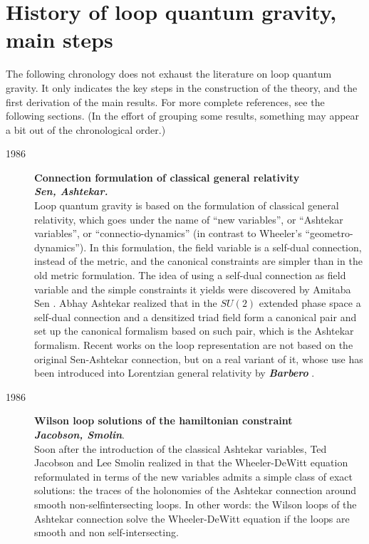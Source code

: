 \section{History of loop quantum gravity, main steps}\label{3}

The following chronology does not exhaust the literature on loop 
quantum gravity.  It only indicates the key steps in the construction 
of the theory, and the first derivation of the main results.  For more 
complete references, see the following sections.  (In the effort 
of grouping some results, something may appear a bit out of the 
chronological order.) 

\begin{description}

	\item[1986] {\bf  Connection formulation of classical general 
 	relativity\\ {\em Sen, Ashtekar.}}\\ 
	Loop quantum gravity is based on the formulation of classical 
	general relativity, which goes under the name of ``new 
	variables'', or ``Ashtekar variables'', or ``connectio-dynamics'' 
	(in contrast to Wheeler's ``geometro-dynamics'').  In this 
	formulation, the field variable is a self-dual connection, instead 
	of the metric, and the canonical constraints are simpler than in 
	the old metric formulation.  The idea of using a self-dual 
	connection as field variable and the simple constraints it yields 
	were discovered by Amitaba Sen \cite{Sen}.  Abhay Ashtekar 
	realized that in the $SU(2)$ extended phase space a self-dual 
	connection and a densitized triad field form a canonical pair 
	\cite{Ashtekar86,Ashtekar87} and set up the canonical formalism 
	based on such pair, which is the Ashtekar formalism.  Recent works 
	on the loop representation are not based on the original 
	Sen-Ashtekar connection, but on a real variant of it, whose use 
	has been introduced into Lorentzian general relativity by 
	\textbf{\em Barbero} \cite{Barbero,Barbero3,Barbero2,Barbero4}.

	\item[1986] {\bf  Wilson loop solutions of the hamiltonian 
	constraint\\ {\em Jacobson, Smolin}}.\\ Soon after 
	the introduction of the classical Ashtekar variables, Ted 
	Jacobson and Lee Smolin realized in \cite{JacobsonSmolin} 
	that the Wheeler-DeWitt equation reformulated in terms of the 
	new variables admits a simple class of exact solutions: the 
	traces of the holonomies of the Ashtekar connection around 
	smooth non-selfintersecting loops.  In other words: the 
	Wilson loops of the Ashtekar connection solve the 
	Wheeler-DeWitt equation if the loops are smooth and non 
	self-intersecting.


\end{description}
